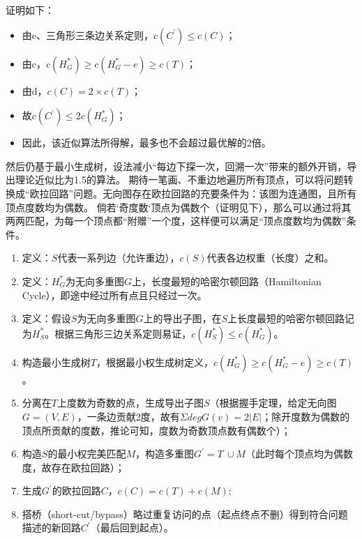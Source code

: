 \documentclass[12pt]{ctexart}
\begin{document}
证明如下：
\begin{itemize}
    \item 由e、三角形三条边关系定则，$c\left(C^\prime\right)\le c\left(C\right)$；
    \item 由c，$c\left(H_G^\ast\right)\geq c\left(H_G^\ast-e\right)\geq c\left(T\right)$；
    \item 由d，$c\left(C\right)=2\times c\left(T\right)$；
    \item 故$c\left(C^\prime\right)\le2c\left(H_G^\ast\right)$；
    \item 因此，该近似算法所得解，最多也不会超过最优解的2倍。
\end{itemize}

然后仍基于最小生成树，设法减小“每边下探一次，回溯一次”带来的额外开销，导出理论近似比为1.5的算法。
期待一笔画、不重边地遍历所有顶点，可以将问题转换成“欧拉回路”问题。无向图存在欧拉回路的充要条件为：该图为连通图，且所有顶点度数均为偶数。
倘若`奇度数`顶点为偶数个（证明见下），那么可以通过将其两两匹配，为每一个顶点都“附赠”一个度，这样便可以满足“顶点度数均为偶数”条件。

\begin{enumerate}[label= (\alph*)]
    \item 定义：$S$代表一系列边（允许重边），$c\left(S\right)$代表各边权重（长度）之和。
    \item 定义：$H_G^\ast$为无向多重图$G$上，长度最短的哈密尔顿回路（Hamiltonian Cycle），即途中经过所有点且只经过一次。
    \item 定义：假设$S$为无向多重图$G$上的导出子图，在$S$上长度最短的哈密尔顿回路记为$H_S^\ast$。根据三角形三边关系定则易证，$c\left(H_S^\ast\right)\le c\left(H_G^\ast\right)$。
    \item 构造最小生成树$T$，根据最小权生成树定义，$c\left(H_G^\ast\right)\geq c\left(H_G^\ast-e\right)\geq c\left(T\right)$。
    \item 分离在$T$上度数为奇数的点，生成导出子图$S$（根据握手定理，给定无向图$G=\left(V,E\right)$，一条边贡献2度，故有$\Sigma degG\left(v\right)=2\left|E\right|$；除开度数为偶数的顶点所贡献的度数，推论可知，度数为奇数顶点数有偶数个）；
    \item 构造$S$的最小权完美匹配$M$，构造多重图$G^\prime=T\ \cup M$（此时每个顶点均为偶数度，故存在欧拉回路）；
    \item 生成$G^\prime$的欧拉回路$C$，$c\left(C\right)=c\left(T\right)+c\left(M\right)$;
    \item 搭桥（short-cut/bypass）略过重复访问的点（起点终点不删）得到符合问题描述的新回路$C^\prime$（最后回到起点）。
\end{enumerate}
\end{document}
